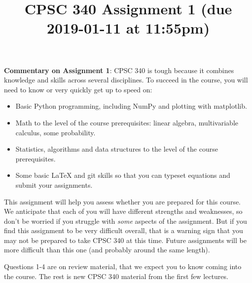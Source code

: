\documentclass{article}
\begin{document}

\title{CPSC 340 Assignment 1 (due 2019-01-11 at 11:55pm)}

\date{}
\maketitle


\vspace{-4em}

\textbf{Commentary on Assignment 1}: CPSC 340 is tough because it combines knowledge and skills across several disciplines. To succeed
in the course, you will need to know or very quickly get up to speed on:
\begin{itemize}
\item Basic Python programming, including NumPy and plotting with matplotlib.
\item Math to the level of the course prerequisites: linear algebra, multivariable calculus, some probability.
\item Statistics, algorithms and data structures to the level of the course prerequisites.
\item Some basic LaTeX and git skills so that you can typeset equations and submit your assignments.
\end{itemize}
  
This assignment will help you assess whether you are prepared for this course. We anticipate that each
of you will have different strengths and weaknesses, so don't be worried if you struggle with \emph{some} aspects
of the assignment. But if you find this assignment
to be very difficult overall, that is a warning sign that you may not be prepared to take CPSC 340
at this time. Future assignments will be more difficult than this one (and probably around the same length).

Questions 1-4 are on review material, that we expect you to know coming into the course. The rest is new CPSC 340 material from the first few lectures.
\end{document}
